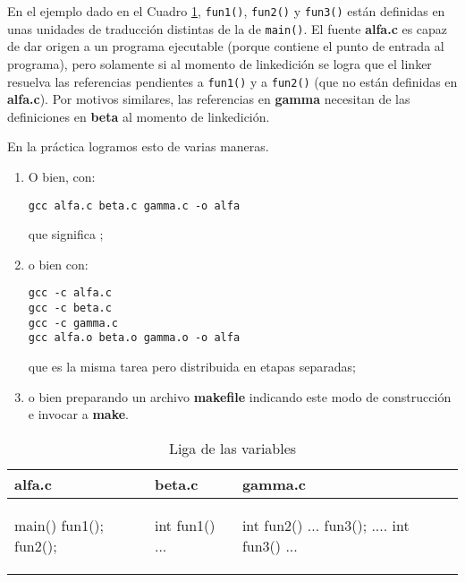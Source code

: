 \begin{ejemplo}
En el ejemplo dado en el Cuadro \ref{tab:ejliga}, \lstinline{fun1()}, \lstinline{fun2()} y \lstinline{fun3()} están definidas en unas unidades de traducción distintas de la de \lstinline{main()}. El fuente \textbf{alfa.c} es capaz de dar origen a un programa ejecutable (porque contiene el punto de entrada al programa), pero solamente si al momento de linkedición se logra que el linker resuelva las
referencias pendientes a \lstinline{fun1()} y a \lstinline{fun2()} (que no están definidas en \textbf{alfa.c}). Por motivos similares,
las referencias en \textbf{gamma} necesitan de las definiciones en \textbf{beta} al momento de linkedición.

En la práctica logramos esto de varias maneras.
\begin{enumerate}
	\item O bien, con:
\begin{lstlisting}
gcc alfa.c beta.c gamma.c -o alfa
\end{lstlisting}

que significa ; 
\item o bien con:

\begin{lstlisting}
gcc -c alfa.c
gcc -c beta.c
gcc -c gamma.c
gcc alfa.o beta.o gamma.o -o alfa
\end{lstlisting}

que es la misma tarea pero distribuida en etapas separadas;
\item o bien preparando un archivo \textbf{makefile} indicando este modo de construcción e invocar a \textbf{make}.
\end{enumerate}


\begin{table}
\centering	
\begin{tabular}{l|l|l}
alfa.c & beta.c & gamma.c \\
\hline
\begin{codecell}
main()
{
	fun1();
	fun2();
}
\end{codecell}
&
\begin{codecell}
int fun1()
{
	...
}
\end{codecell}
&
\begin{codecell}
int fun2()
{
	...
	fun3();
	....
}
int fun3()
{
	...
}
\end{codecell}
\\
\end{tabular}
 \caption{Liga de las variables}
 \label{tab:ejliga} 
\end{table}
\end{ejemplo}


